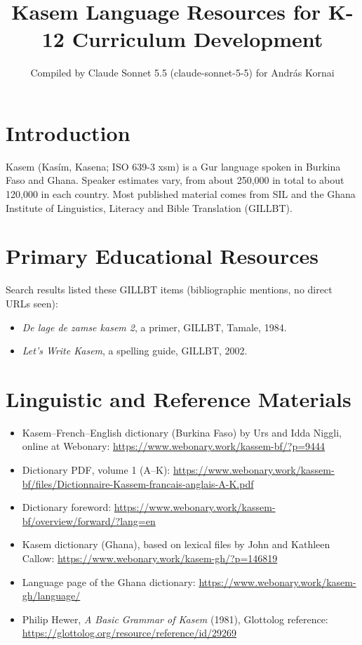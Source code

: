 \documentclass[12pt]{article}
\title{Kasem Language Resources for K-12 Curriculum Development}
\author{Compiled by Claude Sonnet 5.5 (claude-sonnet-5-5) for Andr\'as Kornai}
\date{}
\begin{document}
\maketitle

\section{Introduction}
Kasem (Kas\'im, Kasena; ISO 639-3 xsm) is a Gur language spoken in Burkina Faso and Ghana. Speaker estimates vary, from about 250,000 in total to about 120,000 in each country. Most published material comes from SIL and the Ghana Institute of Linguistics, Literacy and Bible Translation (GILLBT).

\section{Primary Educational Resources}
Search results listed these GILLBT items (bibliographic mentions, no direct URLs seen):
\begin{itemize}
\item \emph{De lage de zamse kasem 2}, a primer, GILLBT, Tamale, 1984.
\item \emph{Let's Write Kasem}, a spelling guide, GILLBT, 2002.
\end{itemize}

\section{Linguistic and Reference Materials}
\begin{itemize}
\item Kasem--French--English dictionary (Burkina Faso) by Urs and Idda Niggli, online at Webonary: \url{https://www.webonary.work/kassem-bf/?p=9444}
\item Dictionary PDF, volume 1 (A--K): \url{https://www.webonary.work/kassem-bf/files/Dictionnaire-Kassem-francais-anglais-A-K.pdf}
\item Dictionary foreword: \url{https://www.webonary.work/kassem-bf/overview/forward/?lang=en}
\item Kasem dictionary (Ghana), based on lexical files by John and Kathleen Callow: \url{https://www.webonary.work/kasem-gh/?p=146819}
\item Language page of the Ghana dictionary: \url{https://www.webonary.work/kasem-gh/language/}
\item Philip Hewer, \emph{A Basic Grammar of Kasem} (1981), Glottolog reference: \url{https://glottolog.org/resource/reference/id/29269}
\end{itemize}
\end{document}
